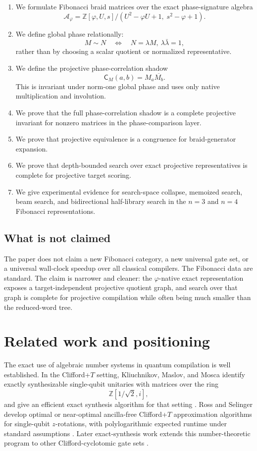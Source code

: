 \documentclass[11pt]{article}
\newcommand{\ph}{\varphi}
\newcommand{\Z}{\mathbb Z}
\newcommand{\A}{\mathcal A}
\newcommand{\shadow}{\mathsf C}
\begin{document}
\begin{enumerate}[label=(\roman*)]
    \item We formulate Fibonacci braid matrices over the exact phase-signature algebra
    \[
        \A_\ph=\Z[\ph,U,s]/(U^2-\ph U+1,\;s^2-\ph+1).
    \]
    \item We define global phase relationally:
    \[
        M\sim N
        \quad\Longleftrightarrow\quad
        N=\lambda M,\ \lambda\bar\lambda=1,
    \]
    rather than by choosing a scalar quotient or normalized representative.
    \item We define the projective phase-correlation shadow
    \[
        \shadow_M(a,b)=M_a\overline{M_b}.
    \]
    This is invariant under norm-one global phase and uses only native multiplication and involution.
    \item We prove that the full phase-correlation shadow is a complete projective invariant for nonzero matrices in the phase-comparison layer.
    \item We prove that projective equivalence is a congruence for braid-generator expansion.
    \item We prove that depth-bounded search over exact projective representatives is complete for projective target scoring.
    \item We give experimental evidence for search-space collapse, memoized search, beam search, and bidirectional half-library search in the $n=3$ and $n=4$ Fibonacci representations.
\end{enumerate}

\subsection*{What is not claimed}

The paper does not claim a new Fibonacci category, a new universal gate set, or a universal wall-clock speedup over all classical compilers.  The Fibonacci data are standard.  The claim is narrower and cleaner: the $\ph$-native exact representation exposes a target-independent projective quotient graph, and search over that graph is complete for projective compilation while often being much smaller than the reduced-word tree.


\section{Related work and positioning}

The exact use of algebraic number systems in quantum compilation is well established.  In the Clifford+$T$ setting, Kliuchnikov, Maslov, and Mosca identify exactly synthesizable single-qubit unitaries with matrices over the ring
\[
    \Z[1/\sqrt2,i],
\]
and give an efficient exact synthesis algorithm for that setting \cite{KliuchnikovMaslovMosca2012}.  Ross and Selinger develop optimal or near-optimal ancilla-free Clifford+$T$ approximation algorithms for single-qubit $z$-rotations, with polylogarithmic expected runtime under standard assumptions \cite{RossSelinger2014}.  Later exact-synthesis work extends this number-theoretic program to other Clifford-cyclotomic gate sets \cite{ForestGossetKliuchnikovMcKinnon2015}.
\end{document}
